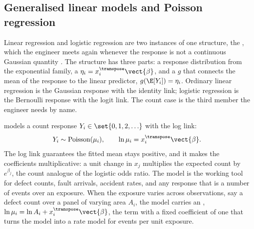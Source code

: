 

\subsection{Generalised linear models and Poisson regression}

Linear regression and logistic regression are two instances of one
structure, the , which the engineer
meets again whenever the response is not a continuous Gaussian
quantity \cite[ch.~4]{text:hastie-tibshirani-friedman}. The structure
has three parts: a response distribution from the exponential family,
a  $\eta_{i} = x_{i}^{\transpose}\vect{\beta}$,
and a  $g$ that connects the mean of the
response to the linear predictor, $g(\E[Y_{i}]) = \eta_{i}$. Ordinary
linear regression is the Gaussian response with the identity link;
logistic regression is the Bernoulli response with the logit link.
The count case is the third member the engineer needs by name.

 models a count response $Y_{i} \in
\set{0, 1, 2, \ldots}$ with the log link:
\[
Y_{i} \sim \mathrm{Poisson}(\mu_{i}),
\qquad \ln\mu_{i} = x_{i}^{\transpose}\vect{\beta}.
\]
The log link guarantees the fitted mean stays positive, and it makes
the coefficients multiplicative: a unit change in $x_{j}$ multiplies
the expected count by $e^{\beta_{j}}$, the count analogue of the
logistic odds ratio. The model is the working tool for defect counts,
fault arrivals, accident rates, and any response that is a number of
events over an exposure. When the exposure varies across observations,
say a defect count over a panel of varying area $A_{i}$, the model
carries an , $\ln\mu_{i} = \ln A_{i} +
x_{i}^{\transpose}\vect{\beta}$, the term with a fixed coefficient of
one that turns the model into a rate model for events per unit
exposure.

